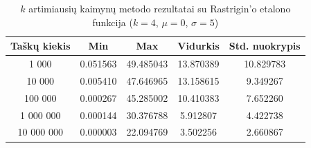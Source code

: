 \begin{table}[H]
    \centering
    \begin{tabular}{|c|c|c|c|c|}
        \hline
        \textbf{Taškų kiekis} & \textbf{Min} & \textbf{Max} & \textbf{Vidurkis} & \textbf{Std. nuokrypis} \\ \hline
        1 000        & 0.051563 & 49.485043 & 13.870389 & 10.829783 \\ \hline
        10 000       & 0.005410 & 47.646965 & 13.158615 & 9.349267 \\ \hline
        100 000      & 0.000267 & 45.285002 & 10.410383 & 7.652260 \\ \hline
        1 000 000    & 0.000144 & 30.376788 & 5.912807 & 4.422738 \\ \hline
        10 000 000   & 0.000003 & 22.094769 & 3.502256 & 2.660867 \\ \hline
    \end{tabular}
    \caption{$k$ artimiausių kaimynų metodo rezultatai su Rastrigin'o etalono funkcija ($k = 4$, $\mu = 0$, $\sigma = 5$)}
\end{table}